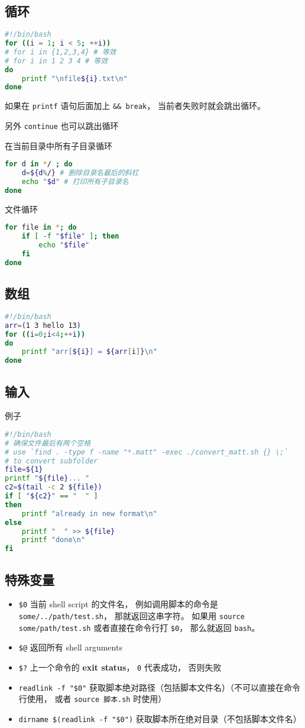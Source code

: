\subsection{循环}
\begin{lstlisting}[language=bash]
#!/bin/bash
for ((i = 1; i < 5; ++i))
# for i in {1,2,3,4} # 等效
# for i in 1 2 3 4 # 等效
do
	printf "\nfile${i}.txt\n"
done
\end{lstlisting}
如果在 \verb|printf| 语句后面加上 \verb|&& break|， 当前者失败时就会跳出循环。

另外 \verb`continue` 也可以跳出循环

在当前目录中所有子目录循环
\begin{lstlisting}[language=bash]
for d in */ ; do
    d=${d%/} # 删除目录名最后的斜杠
    echo "$d" # 打印所有子目录名
done
\end{lstlisting}
文件循环
\begin{lstlisting}[language=bash]
for file in *; do
    if [ -f "$file" ]; then
        echo "$file"
    fi
done
\end{lstlisting}

\subsection{数组}
\begin{lstlisting}[language=bash]
#!/bin/bash
arr=(1 3 hello 13)
for ((i=0;i<4;++i))
do
    printf "arr[${i}] = ${arr[i]}\n"
done
\end{lstlisting}


\subsection{输入}
例子
\begin{lstlisting}[language=bash]
#!/bin/bash
# 确保文件最后有两个空格
# use `find . -type f -name "*.matt" -exec ./convert_matt.sh {} \;`
# to convert subfolder
file=${1}
printf "${file}... "
c2=$(tail -c 2 ${file})
if [ "${c2}" == "  " ]
then
	printf "already in new format\n"
else
	printf "  " >> ${file}
	printf "done\n"
fi
\end{lstlisting}

\subsection{特殊变量}
\begin{itemize}
\item \verb`$0` 当前 shell script 的文件名， 例如调用脚本的命令是 \verb|some/../path/test.sh|， 那就返回这串字符。 如果用 \verb|source some/path/test.sh| 或者直接在命令行打 \verb|$0|， 那么就返回 \verb|bash|。
\item \verb`$@` 返回所有 shell arguments
\item \verb|$?| 上一个命令的 \textbf{exit status}， \verb|0| 代表成功， 否则失败
\item \verb|readlink -f "$0"| 获取脚本绝对路径（包括脚本文件名）（不可以直接在命令行使用， 或者 \verb|source 脚本.sh| 时使用）
\item \verb|dirname $(readlink -f "$0")| 获取脚本所在绝对目录（不包括脚本文件名）
\end{itemize}

